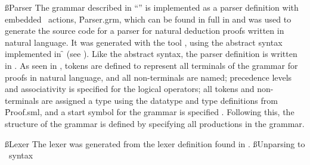\documentclass[BA.tex]{subfiles}
\begin{document}
\ss{Parser}
The grammar described in ``'' is implemented as a parser
 definition with embedded
 \sml\ actions, \f{Parser.grm}, which can be found in full in 
 and was used to generate the source code for
 a parser for natural deduction proofs
 written in natural language. It was generated with the tool \yac ,
 using the abstract syntax implemented in \f{}
 (see ). Like the abstract syntax, the parser definition is
 written in .
 As seen in , tokens are defined to
 represent all terminals of the grammar for proofs in natural language,
 and all non-terminals are named; precedence levels and
 associativity is specified for the logical operators; all tokens and
 non-terminals are assigned a type using the datatype and type definitions
 from \f{Proof.sml}, and a start symbol for the grammar is specified
 .
 Following this, the structure of the grammar is defined by specifying all
 productions in the grammar.

 
\ss{Lexer}
The lexer was generated from the lexer definition found in .
\ss{Unparsing to \bp\ syntax}
\FIX{}
\end{document}
